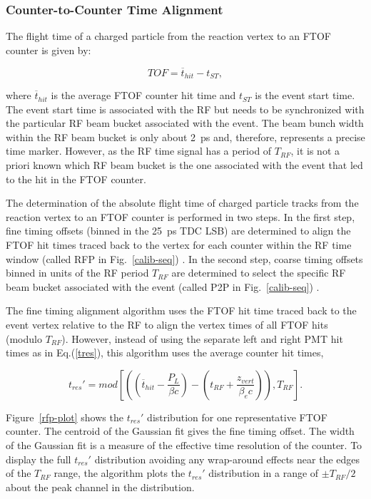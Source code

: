 \documentclass{elsart}
\begin{document}
\subsubsection{Counter-to-Counter Time Alignment}
\label{sec-talign}

The flight time of a charged particle from the reaction vertex to an FTOF counter is given by:

\begin{equation}
TOF = \overline{t}_{hit} - t_{ST},
\end{equation}

\noindent
where $\overline{t}_{hit}$ is the average FTOF counter hit time and $t_{ST}$ is the event start time.
The event start time is associated with the RF but needs to be synchronized with the particular RF
beam bucket associated with the event. The beam bunch width within the RF beam bucket is only
about 2~ps and, therefore, represents a precise time marker. However, as the RF time signal has a
period of $T_{RF}$, it is not a priori known which RF beam bucket is the one associated with the
event that led to the hit in the FTOF counter.

The determination of the absolute flight time of charged particle tracks from the reaction vertex
to an FTOF counter is performed in two steps. In the first step, fine timing offsets (binned in the
25~ps TDC LSB) are determined to align the FTOF hit times traced back to the vertex for each
counter within the RF time window (called RFP in Fig.~\ref{calib-seq}) . In the second step, coarse
timing offsets binned in units of the RF period $T_{RF}$ are determined to select the specific RF
beam bucket associated with the event (called P2P in Fig.~\ref{calib-seq}) .

The fine timing alignment algorithm uses the FTOF hit time traced back to the event vertex relative
to the RF to align the vertex times of all FTOF hits (modulo $T_{RF}$). However, instead of using the
separate left and right PMT hit times as in Eq.(\ref{tres}), this algorithm uses the average counter
hit times, 

\begin{equation}
t_{res}' = mod \left[ \left( \left(\overline{t}_{hit} - \frac{P_L}{\beta c} \right) -
\left(t_{RF} + \frac{z_{vert}}{\beta_e c} \right) \right), T_{RF} \right].
\end{equation}

Figure~\ref{rfp-plot} shows the $t_{res}'$ distribution for one representative FTOF counter. The
centroid of the Gaussian fit gives the fine timing offset. The width of the Gaussian fit is a measure
of the effective time resolution of the counter. To display the full $t_{res}'$ distribution avoiding any
wrap-around effects near the edges of the $T_{RF}$ range, the algorithm plots the $t_{res}'$ distribution
in a range of $\pm T_{RF}/2$ about the peak channel in the distribution.
\end{document}
